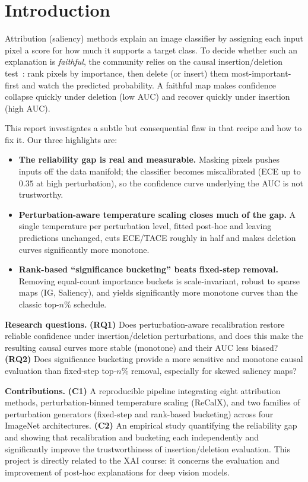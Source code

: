 \documentclass[11pt]{article}
\begin{document}
\section{Introduction}

Attribution (saliency) methods explain an image classifier by assigning each
input pixel a score for how much it supports a target class. To decide whether
such an explanation is \emph{faithful}, the community relies on the causal
insertion/deletion test~\citep{petsiuk2018rise}: rank pixels by importance, then
delete (or insert) them most-important-first and watch the predicted
probability. A faithful map makes confidence collapse quickly under deletion
(low AUC) and recover quickly under insertion (high AUC).

This report investigates a subtle but consequential flaw in that recipe and how
to fix it. Our three highlights are:

\begin{itemize}[leftmargin=1.4em,itemsep=2pt,topsep=2pt]
  \item \textbf{The reliability gap is real and measurable.} Masking pixels
  pushes inputs off the data manifold; the classifier becomes miscalibrated
  (ECE up to $0.35$ at high perturbation), so the confidence curve underlying
  the AUC is not trustworthy.
  \item \textbf{Perturbation-aware temperature scaling closes much of the gap.}
  A single temperature per perturbation level, fitted post-hoc and leaving
  predictions unchanged, cuts ECE/TACE roughly in half and makes deletion curves
  significantly more monotone.
  \item \textbf{Rank-based ``significance bucketing'' beats fixed-step removal.}
  Removing equal-count importance buckets is scale-invariant, robust to sparse
  maps (IG, Saliency), and yields significantly more monotone curves than the
  classic top-$n\%$ schedule.
\end{itemize}

\textbf{Research questions.}
\textbf{(RQ1)} Does perturbation-aware recalibration restore reliable confidence
under insertion/deletion perturbations, and does this make the resulting causal
curves more stable (monotone) and their AUC less biased?
\textbf{(RQ2)} Does significance bucketing provide a more sensitive and monotone
causal evaluation than fixed-step top-$n\%$ removal, especially for skewed
saliency maps?

\textbf{Contributions.}
\textbf{(C1)} A reproducible pipeline integrating eight attribution methods,
perturbation-binned temperature scaling (ReCalX), and two families of
perturbation generators (fixed-step and rank-based bucketing) across four
ImageNet architectures.
\textbf{(C2)} An empirical study quantifying the reliability gap and showing that
recalibration and bucketing each independently and significantly improve the
trustworthiness of insertion/deletion evaluation.
This project is directly related to the XAI course: it concerns the evaluation
and improvement of post-hoc explanations for deep vision models.
\end{document}
